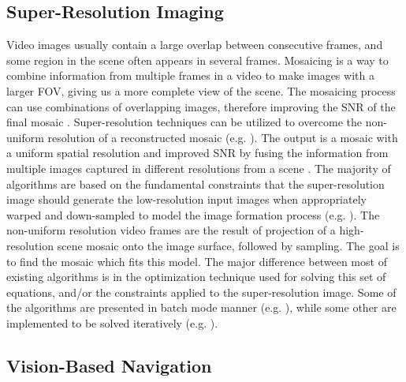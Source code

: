 
\subsection{Super-Resolution Imaging}

Video images usually contain a large overlap between consecutive frames, and some region in the
scene often appears in several frames. Mosaicing is a way to combine information from multiple
frames in a video to make images with a larger FOV, giving us a more complete view of the scene.
The mosaicing process can use combinations of overlapping images, therefore improving the SNR of
the final mosaic \cite{ela97,zom98,zom00}.
Super-resolution techniques can be utilized to overcome the non-uniform resolution of a
reconstructed mosaic (e.g. \cite{zom00}). The output is a mosaic with a uniform spatial resolution
and improved SNR by fusing the information from multiple images captured in different resolutions
from a scene \cite{ela97,zom98,zom00}. The majority of algorithms are based on the fundamental
constraints that the super-resolution image should generate the low-resolution input images when
appropriately warped and down-sampled to model the image formation process (e.g.
\cite{ela99,har97,ira93,pat97,sch96,sme00,zom00}). The non-uniform resolution video frames are the
result of projection of a high-resolution scene mosaic onto the image surface, followed by
sampling. The goal is to find the mosaic which fits this model. The major difference between most
of existing algorithms is in the optimization technique used for solving this set of equations,
and/or the constraints applied to the super-resolution image. Some of the algorithms are presented
in batch mode manner (e.g. \cite{del98}), while some other are implemented to be solved iteratively
(e.g. \cite{zom00}).

\subsection{Vision-Based Navigation}

